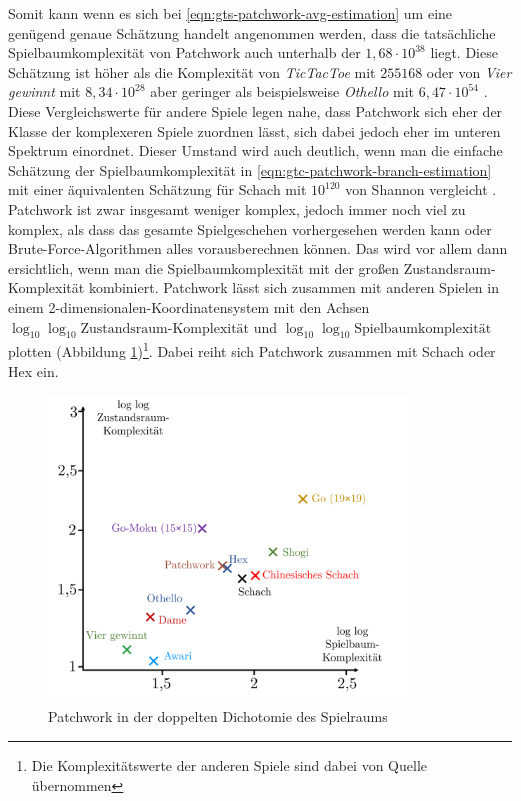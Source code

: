 Somit kann \textendash{} wenn es sich bei \ref{eqn:gts-patchwork-avg-estimation} um eine genügend genaue Schätzung handelt \textendash{} angenommen werden, dass die tatsächliche Spielbaumkomplexität von Patchwork auch unterhalb der $1{,}68 \cdot 10^{38}$ liegt. Diese Schätzung ist höher als die Komplexität von \emph{TicTacToe} mit $255168$ \cite{2024.TicTacToe} oder von \emph{Vier gewinnt} mit $8{,}34 \cdot 10^{28}$ \cite[S. 3]{2019.GameTreeComplexityEstimation} aber geringer als beispielsweise \emph{Othello} mit $6{,}47 \cdot 10^{54}$ \cite[S. 4]{2019.GameTreeComplexityEstimation}. Diese Vergleichswerte für andere Spiele legen nahe, dass Patchwork sich eher der Klasse der komplexeren Spiele zuordnen lässt, sich dabei jedoch eher im unteren Spektrum einordnet. Dieser Umstand wird auch deutlich, wenn man die einfache Schätzung der Spielbaumkomplexität in \ref{eqn:gtc-patchwork-branch-estimation} mit einer äquivalenten Schätzung für Schach mit $10^{120}$ von Shannon vergleicht \cite[S. 4]{1950.ChessShannon}. Patchwork ist zwar insgesamt weniger komplex, jedoch immer noch viel zu komplex, als dass das gesamte Spielgeschehen vorhergesehen werden kann oder Brute-Force-Algorithmen alles vorausberechnen können. Das wird vor allem dann ersichtlich, wenn man die Spielbaumkomplexität mit der großen Zustandsraum-Komplexität kombiniert. Patchwork lässt sich zusammen mit anderen Spielen in einem 2-dimensionalen-Koordinatensystem mit den Achsen \emph{$\log_{10} \log_{10} \text{Zustandsraum-Komplexität}$} und \emph{$\log_{10} \log_{10} \text{Spielbaumkomplexität}$} plotten (Abbildung \ref{fig:game-complexity-coordinate-system})\footnote{Die Komplexitätswerte der anderen Spiele sind dabei von Quelle \cite[S. 300]{2002.GamesSolved} übernommen}. Dabei reiht sich Patchwork zusammen mit Schach oder Hex ein.

\begin{figure}[!ht]
    \centering
    \includegraphics[width=0.85\textwidth]{res/pictures/game-complexity-coordinate-system.pdf}
    \caption{Patchwork in der doppelten Dichotomie des Spielraums}
    \label{fig:game-complexity-coordinate-system}
\end{figure}

